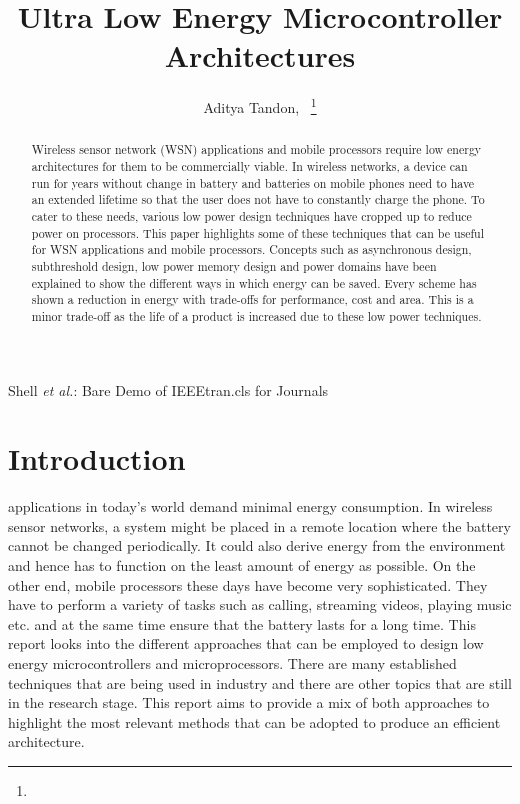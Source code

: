 \documentclass[journal]{IEEEtran}
\begin{document}
\title{Ultra Low Energy Microcontroller Architectures}
\author{Aditya Tandon,~ 
\thanks{}}
{Shell \MakeLowercase{\textit{et al.}}: Bare Demo of IEEEtran.cls for Journals}
\maketitle

\begin{abstract}
Wireless sensor network (WSN) applications and mobile processors require low energy architectures for them to be commercially viable. In wireless networks, a device can run for years without change in battery and batteries on mobile phones need to have an extended lifetime so that the user does not have to constantly charge the phone. To cater to these needs, various low power design techniques have cropped up to reduce power on processors. This paper highlights some of these techniques that can be useful for WSN applications and mobile processors. Concepts such as asynchronous design, subthreshold design, low power memory design and power domains have been explained to show the different ways in which energy can be saved.  Every scheme has shown a reduction in energy with trade-offs for performance, cost and area. This is a minor trade-off as the life of a product is increased due to these low power techniques.
\end{abstract}
\IEEEpeerreviewmaketitle

\section{Introduction}
 applications in today’s world demand minimal energy consumption. In wireless sensor networks, a system might be placed in a remote location where the battery cannot be changed periodically. It could also derive energy from the environment and hence has to function on the least amount of energy as possible. On the other end, mobile processors these days have become very sophisticated. They have to perform a variety of tasks such as calling, streaming videos, playing music etc. and at the same time ensure that the battery lasts for a long time. This report looks into the different approaches that can be employed to design low energy microcontrollers and microprocessors. There are many established techniques that are being used in industry and there are other topics that are still in the research stage. This report aims to provide a mix of both approaches to highlight the most relevant methods that can be adopted to produce an efficient architecture. \\
\end{document}
